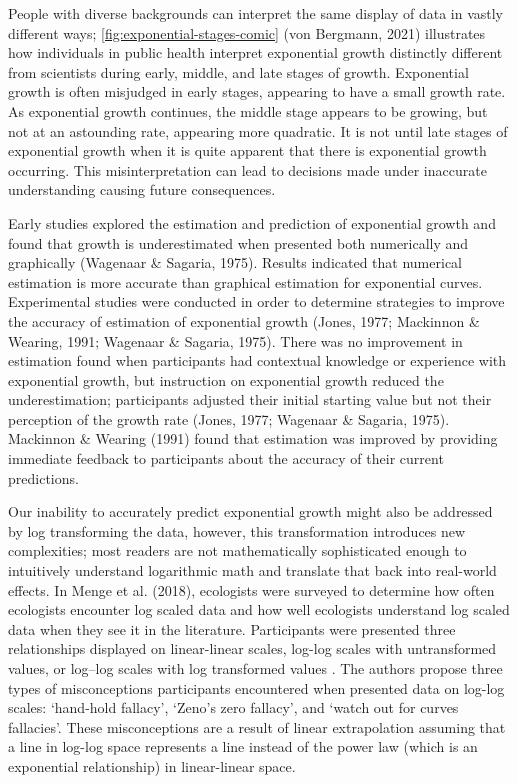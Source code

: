 \documentclass[print]{nuthesis}
\begin{document}
People with diverse backgrounds can interpret the same display of data in vastly different ways; \cref{fig:exponential-stages-comic} (von Bergmann, 2021) illustrates how individuals in public health interpret exponential growth distinctly different from scientists during early, middle, and late stages of growth.
Exponential growth is often misjudged in early stages, appearing to have a small growth rate.
As exponential growth continues, the middle stage appears to be growing, but not at an astounding rate, appearing more quadratic.
It is not until late stages of exponential growth when it is quite apparent that there is exponential growth occurring.
This misinterpretation can lead to decisions made under inaccurate understanding causing future consequences.

Early studies explored the estimation and prediction of exponential growth and found that growth is underestimated when presented both numerically and graphically (Wagenaar \& Sagaria, 1975).
Results indicated that numerical estimation is more accurate than graphical estimation for exponential curves.
Experimental studies were conducted in order to determine strategies to improve the accuracy of estimation of exponential growth (Jones, 1977; Mackinnon \& Wearing, 1991; Wagenaar \& Sagaria, 1975).
There was no improvement in estimation found when participants had contextual knowledge or experience with exponential growth, but instruction on exponential growth reduced the underestimation; participants adjusted their initial starting value but not their perception of the growth rate (Jones, 1977; Wagenaar \& Sagaria, 1975).
Mackinnon \& Wearing (1991) found that estimation was improved by providing immediate feedback to participants about the accuracy of their current predictions.

Our inability to accurately predict exponential growth might also be addressed by log transforming the data, however, this transformation introduces new complexities; most readers are not mathematically sophisticated enough to intuitively understand logarithmic math and translate that back into real-world effects.
In Menge et al. (2018), ecologists were surveyed to determine how often ecologists encounter log scaled data and how well ecologists understand log scaled data when they see it in the literature.
Participants were presented three relationships displayed on linear-linear scales, log-log scales with untransformed values, or log--log scales with log transformed values .
The authors propose three types of misconceptions participants encountered when presented data on log-log scales: `hand-hold fallacy', `Zeno's zero fallacy', and `watch out for curves fallacies'.
These misconceptions are a result of linear extrapolation assuming that a line in log-log space represents a line instead of the power law (which is an exponential relationship) in linear-linear space.
\end{document}
